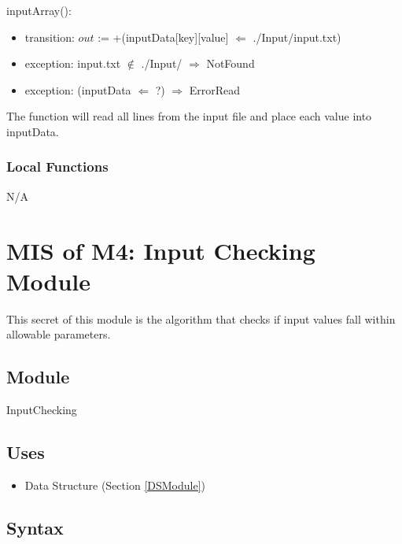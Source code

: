 \documentclass[12pt, titlepage]{article}
\begin{document}
\noindent inputArray():
\begin{itemize}
	\item transition: $out$ := +(inputData[key][value] $\Leftarrow$
          ./Input/input.txt) 
	\item exception: input.txt $\notin$ ./Input/ $\Rightarrow$ NotFound
	\item exception: (inputData $\Leftarrow$ ?) $\Rightarrow$ ErrorRead
\end{itemize}

The function will read all lines from the input file and place each value into inputData.

\subsubsection{Local Functions}
N/A

\newpage

\section{MIS of M4: Input Checking Module} \label{ICModule} 

This secret of this module is the algorithm that checks if input values fall within allowable parameters.

\subsection{Module}

InputChecking

\subsection{Uses}

\begin{itemize}
	\item Data Structure (Section \ref{DSModule})
\end{itemize}

\subsection{Syntax}
\end{document}
